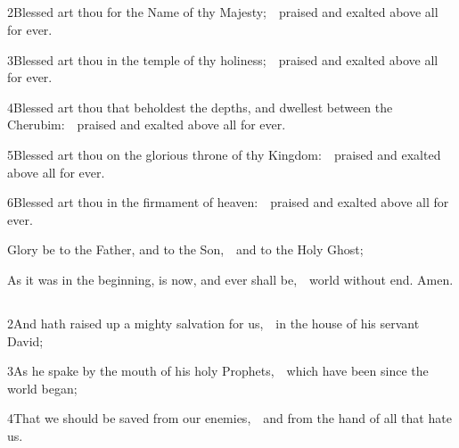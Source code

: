 \subsection{}

2\enspace Blessed art thou for the Name of thy Majesty;\ \star\ praised and exalted above all for ever.

3\enspace Blessed art thou in the temple of thy holiness;\ \star\ praised and exalted above all for ever.

4\enspace Blessed art thou that beholdest the depths, and dwellest between the Cherubim:\ \star\ praised and exalted above all for ever.

5\enspace Blessed art thou on the glorious throne of thy Kingdom:\ \star\ praised and exalted above all for ever.

6\enspace Blessed art thou in the firmament of heaven:\ \star\ praised and exalted above all for ever.

Glory be to the Father, and to the Son,\ \star\ and to the Holy Ghost;

As it was in the beginning, is now, and ever shall be,\ \star\ world without end. Amen.

\subsubsection{}


\subsection{}


2\enspace And hath raised up a mighty salvation for us,\ \star\ in the house of his servant David;

3\enspace As he spake by the mouth of his holy Prophets,\ \star\ which have been since the world began;

4\enspace That we should be saved from our enemies,\ \star\ and from the hand of all that hate us.

